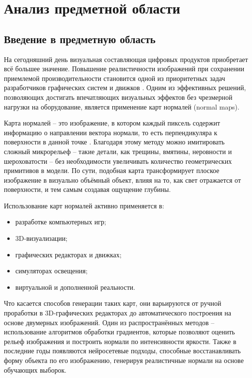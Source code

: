 \section{Анализ предметной области}
\subsection{Введение в предметную область}

На сегодняшний день визуальная составляющая цифровых продуктов приобретает всё большее значение. Повышение реалистичности изображений при сохранении приемлемой производительности становится одной из приоритетных задач разработчиков графических систем и движков \cite{gambetta2021}. Одним из эффективных решений, позволяющих достигать впечатляющих визуальных эффектов без чрезмерной нагрузки на оборудование, является применение карт нормалей (normal maps).

Карта нормалей -- это изображение, в котором каждый пиксель содержит информацию о направлении вектора нормали, то есть перпендикуляра к поверхности в данной точке \cite{lukacs2020}. Благодаря этому методу можно имитировать сложный микрорельеф -- такие детали, как трещины, вмятины, неровности и шероховатости -- без необходимости увеличивать количество геометрических примитивов в модели. По сути, подобная карта трансформирует плоское изображение в визуально объёмный объект, влияя на то, как свет отражается от поверхности, и тем самым создавая ощущение глубины.

Использование карт нормалей активно применяется в:
\begin{itemize}
	\item разработке компьютерных игр;
	\item 3D-визуализации;
	\item графических редакторах и движках;
	\item симуляторах освещения;
	\item виртуальной и дополненной реальности.
\end{itemize}

Что касается способов генерации таких карт, они варьируются от ручной проработки в 3D-графических редакторах до автоматического построения на основе двумерных изображений. Один из распространённых методов -- использование алгоритмов обработки градиентов, которые позволяют оценить рельеф изображения и построить нормали по интенсивности яркости. Также в последние годы появляются нейросетевые подходы, способные восстанавливать форму объекта по его изображению, генерируя реалистичные нормали на основе обучающих выборок.

